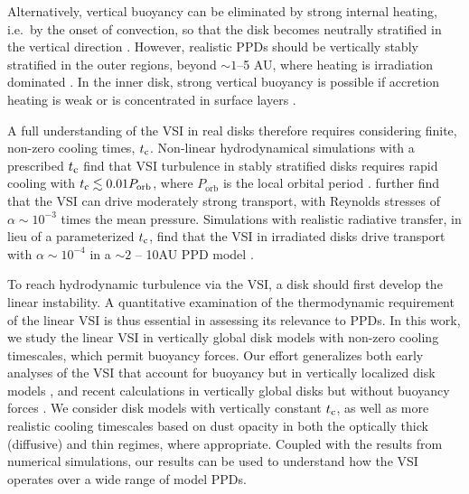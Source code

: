 \documentclass[iop]{emulateapj}
\begin{document}
Alternatively, vertical buoyancy can be eliminated by strong internal
heating, i.e.\ by the onset of convection, so that the disk becomes 
neutrally stratified in the vertical direction
. However, realistic PPDs should be vertically
stably stratified in the outer regions, beyond $\sim 1$--5 AU, where
heating is  irradiation dominated \citep{bitsch15}.  In the inner
disk, strong vertical buoyancy is possible if accretion heating is
weak or is concentrated in surface layers \citep{gammie96,lesniak11}.  

A full understanding of the VSI in real disks therefore requires
considering finite, non-zero cooling times, $t_{\rm c}$. Non-linear
hydrodynamical simulations with a prescribed  $t_{\rm c}$ find that VSI
turbulence in stably stratified disks requires rapid cooling  
with $t_{\rm c} \lesssim 0.01P_{\mathrm{orb}}$, where $P_\mathrm{orb}$ 
is the local orbital period %
 .  further find
that the VSI can drive moderately strong transport, with Reynolds
stresses of $\alpha \sim 10^{-3}$ times the mean pressure. Simulations
with realistic radiative transfer, in lieu of a parameterized $t_{\rm
  c}$, find that the VSI in irradiated disks drive transport with
$\alpha \sim 10^{-4}$  in a  $\sim 2$ -- 10AU PPD model \citep{stoll14}.  

To reach hydrodynamic turbulence via the VSI, a disk should  
first develop the linear instability. A quantitative 
examination of the thermodynamic requirement of the linear VSI is thus essential in assessing its 
relevance to PPDs. In this work, we study the linear VSI in vertically global disk models 
with non-zero cooling timescales, which permit buoyancy forces. 
Our effort generalizes both early analyses of the VSI that account for buoyancy but in vertically localized disk models \citep{urpin98,urpin03}, and
recent calculations in vertically global disks but without buoyancy forces . 
We consider disk   
models with vertically constant $t_{\rm c}$, as well as more realistic
cooling timescales based on dust opacity in both the optically thick
(diffusive) and thin regimes, where appropriate. Coupled with the
results from numerical simulations, our results can be used to 
understand how the VSI operates over a wide range of model PPDs. 
\end{document}
